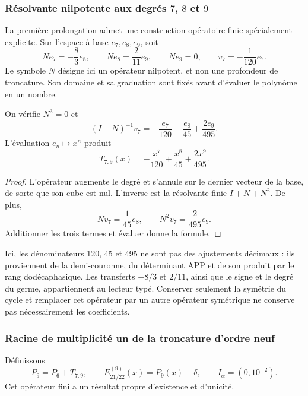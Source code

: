 \subsubsection{Résolvante nilpotente aux degrés \(7\), \(8\) et \(9\)}
\label{subsec:alpha-resolvente}

La première prolongation admet une construction opératoire finie
spécialement explicite. Sur l'espace à base \(e_7,e_8,e_9\),
soit
\[
 Ne_7=-\frac83e_8,\qquad Ne_8=\frac2{11}e_9,\qquad Ne_9=0,
 \qquad v_7=-\frac1{120}e_7.
\]
Le symbole \(N\) désigne ici un opérateur nilpotent, et non une profondeur de troncature. Son domaine et sa graduation sont fixés avant d'évaluer le polynôme en un nombre.

\begin{lemma}
\label{lem:alpha-resolvente}
On vérifie \(N^3=0\) et
\[
 (I-N)^{-1}v_7
 =-\frac{e_7}{120}+\frac{e_8}{45}+\frac{2e_9}{495}.
\]
L'évaluation \(e_n\mapsto x^n\) produit
\begin{equation}
 T_{7:9}(x)=-\frac{x^7}{120}+\frac{x^8}{45}+\frac{2x^9}{495}.
 \label{eq:alpha-t79}
\end{equation}
\end{lemma}

\begin{proof}
L'opérateur augmente le degré et s'annule sur le dernier vecteur de la base,
de sorte que son cube est nul. L'inverse est la résolvante finie
\(I+N+N^2\). De plus,
\[
 Nv_7=\frac1{45}e_8,\qquad N^2v_7=\frac2{495}e_9.
\]
Additionner les trois termes et évaluer donne la formule.
\end{proof}

Ici, les dénominateurs 120, 45 et 495 ne sont pas des ajustements décimaux : ils proviennent de la demi-couronne, du déterminant APP et de son produit par le rang dodécaphasique. Les transferts \(-8/3\) et \(2/11\), ainsi que le signe et le degré du germe, appartiennent au lecteur typé. Conserver seulement la symétrie du cycle et remplacer cet opérateur par un autre opérateur symétrique ne conserve pas nécessairement les coefficients.

\subsubsection{Racine de multiplicité un de la troncature d'ordre neuf}
\label{subsec:alpha-jet}

Définissons
\[
 P_9=P_6+T_{7:9},\qquad E_{21/22}^{(9)}(x)=P_9(x)-\delta,
 \qquad I_\alpha=(0,10^{-2}).
\]
Cet opérateur fini a un résultat propre d'existence et d'unicité.

